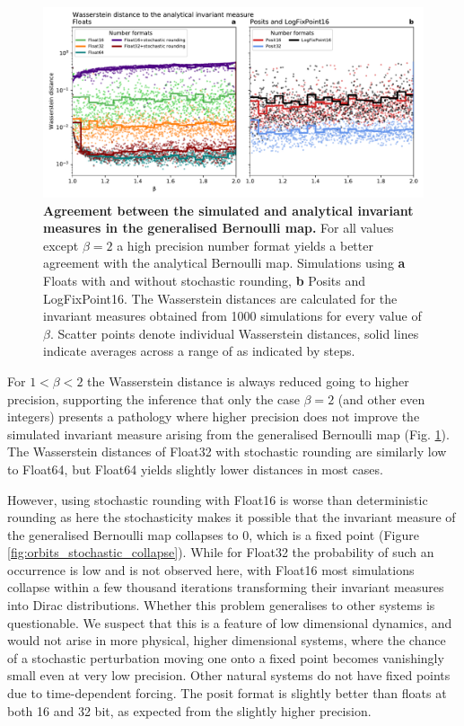 \begin{figure}[tbhp]
	\includegraphics[width=1\textwidth]{Figures/orbits/wasserstein.pdf}
	\caption{\textbf{Agreement between the simulated and analytical invariant measures in the generalised
	Bernoulli map.} For all values except $\beta = 2$ a high precision number format yields a better agreement
	with the analytical Bernoulli map. Simulations using \textbf{a} Floats with and without stochastic rounding, 
	\textbf{b} Posits and LogFixPoint16. The Wasserstein distances are calculated for the invariant measures
	obtained from 1000 simulations for every value of $\beta$. Scatter points denote individual Wasserstein
	distances, solid lines indicate averages across a range of  as indicated by steps.}
	\label{fig:orbits_wasserstein}
\end{figure}

For $1<\beta<2$  the Wasserstein distance is always reduced going to higher precision, supporting the inference that only the case $\beta=2$
(and other even integers) presents a pathology where higher precision does not improve the simulated invariant measure arising from the
generalised Bernoulli map (Fig. \ref{fig:orbits_wasserstein}). The Wasserstein distances of Float32 with stochastic rounding are similarly low
to Float64, but Float64 yields slightly lower distances in most cases.

However, using stochastic rounding with Float16 is worse than deterministic rounding as here the stochasticity makes it possible that the
invariant measure of the generalised Bernoulli map collapses to 0, which is a fixed point (Figure \ref{fig:orbits_stochastic_collapse}).
While for Float32 the probability of such an occurrence is low and is not observed here, with Float16 most simulations collapse within
a few thousand iterations transforming their invariant measures into Dirac distributions. Whether this problem generalises to other
systems is questionable. We suspect that this is a feature of low dimensional dynamics, and would not arise in more physical,
higher dimensional systems, where the chance of a stochastic perturbation moving one onto a fixed point becomes vanishingly
small even at very low precision. Other natural systems do not have fixed points due to time-dependent forcing. The posit format
is slightly better than floats at both 16 and 32 bit, as expected from the slightly higher precision.

